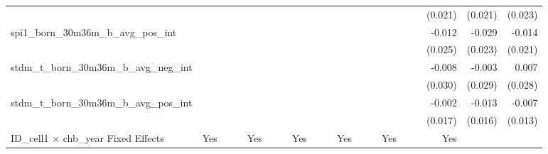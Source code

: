 \begin{tabular}{lrrrrrrrrrrrrrrrrrr}
                                            &              &              &              &              &              &              &              &              &               &              &              &               &              &              &               &      (0.021) &      (0.021) &       (0.023) \\ 
spi1\_born\_30m36m\_b\_avg\_pos\_int        &              &              &              &              &              &              &              &              &               &              &              &               &              &              &               &       -0.012 &       -0.029 &        -0.014 \\ 
                                            &              &              &              &              &              &              &              &              &               &              &              &               &              &              &               &      (0.025) &      (0.023) &       (0.021) \\ 
stdm\_t\_born\_30m36m\_b\_avg\_neg\_int     &              &              &              &              &              &              &              &              &               &              &              &               &              &              &               &       -0.008 &       -0.003 &         0.007 \\ 
                                            &              &              &              &              &              &              &              &              &               &              &              &               &              &              &               &      (0.030) &      (0.029) &       (0.028) \\ 
stdm\_t\_born\_30m36m\_b\_avg\_pos\_int     &              &              &              &              &              &              &              &              &               &              &              &               &              &              &               &       -0.002 &       -0.013 &        -0.007 \\ 
                                            &              &              &              &              &              &              &              &              &               &              &              &               &              &              &               &      (0.017) &      (0.016) &       (0.013) \\ 
\midrule
ID\_cell1 $\times$ chb\_year Fixed Effects  &          Yes &              &              &          Yes &              &              &          Yes &              &               &          Yes &              &               &          Yes &              &               &          Yes &              &               \\ 

\end{tabular}
